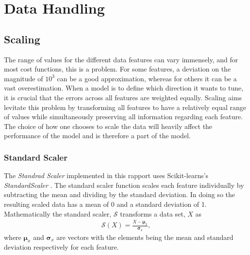 \section{Data Handling}\label{subsec:Scaling}
\subsection{Scaling}
The range of values for the different data features can vary immensely, and for most 
cost functions, this is a problem. For some features, a deviation on the magnitude 
of $10^3$ can be a good approximation, whereas for others it can be a vast 
overestimation. When a model is to define which direction it wants to tune, it is 
crucial that the errors across all features are weighted equally. Scaling aims levitate 
this problem by transforming all features to have a relatively equal range of values while
simultaneously preserving all information regarding each feature. The choice of how one 
chooses to scale the data will heavily affect the performance of the model and is therefore
a part of the model. 
\\
\subsubsection{Standard Scaler}
The \emph{Standrad Scaler} implemented in this rapport uses Scikit-learns's \emph{StandardScaler}
\cite{StandardScaler}. The standard scaler function scales each feature individually by subtracting 
the mean and dividing by the standard deviation. In doing so the resulting scaled data has a mean 
of 0 and a standard deviation of 1. Mathematically the standard scaler, $\mathcal{S}$ transforms 
a data set, $X$ as 
\begin{align}
    \mathcal{S} \left(X\right) = \frac{X - \boldsymbol{\mu} _x}{\boldsymbol{\sigma}_x} ,
\end{align}
where $\boldsymbol{\mu} _x$ and $\boldsymbol{\sigma}_x$ are vectors with the elements being 
the mean and standard deviation respectively for each feature.

